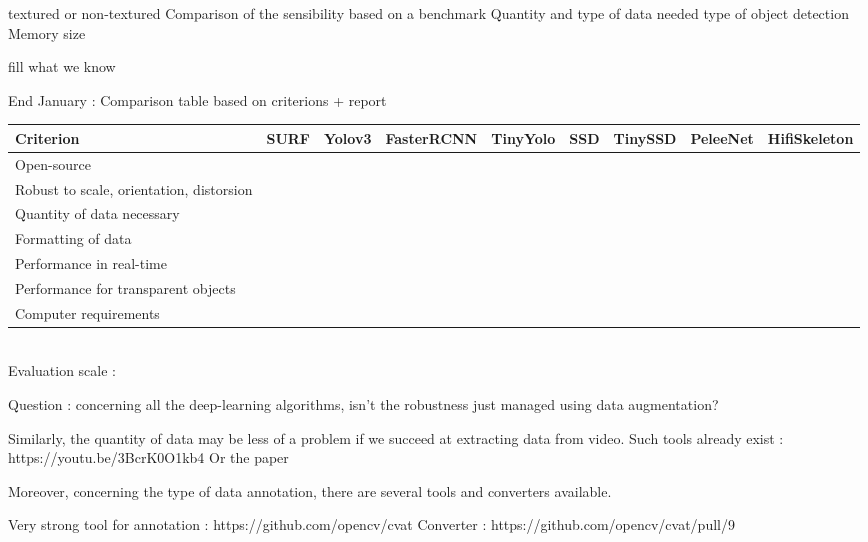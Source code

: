 \documentclass[10pt]{article}
\begin{document}
     textured or non-textured
    Comparison of the sensibility based on a benchmark
    Quantity and type of data needed
    type of object detection
    Memory size
    
    
    fill what we know
    
    
    End January : Comparison table based on criterions + report 
    
    
    \begin{tabular}{ ||p{1.8cm}||p{1cm}|p{1cm}|p{1.8cm}|p{1.5cm}|p{1cm}|p{1.5cm}|p{1.5cm}|p{1.8cm}||  }
\hline
Criterion & SURF & Yolov3 & FasterRCNN & TinyYolo & SSD & TinySSD & PeleeNet & HifiSkeleton\\
\hline
Open-source & & & & & & & & \\
\hline
Robust to scale, orientation, distorsion & & & & & & & & \\
\hline
Quantity of data necessary & & & & & & & & \\
\hline
Formatting of data & & & & & & & & \\
\hline
Performance in real-time & & & & & & & &  \\
\hline
Performance for transparent objects & & & & & & & &  \\
\hline
Computer requirements & & & & & & & & \\
\end{tabular}\\

Evaluation scale :

Question : concerning all the deep-learning algorithms, isn't the robustness just managed using data augmentation? %

Similarly, the quantity of data may be less of a problem if we succeed at extracting data from video. Such tools already exist : https://youtu.be/3BcrK0O1kb4
Or the paper \cite{VideoDetection}

Moreover, concerning the type of data annotation, there are several tools and converters available. 

Very strong tool for annotation : https://github.com/opencv/cvat
Converter : https://github.com/opencv/cvat/pull/9
\end{document}
